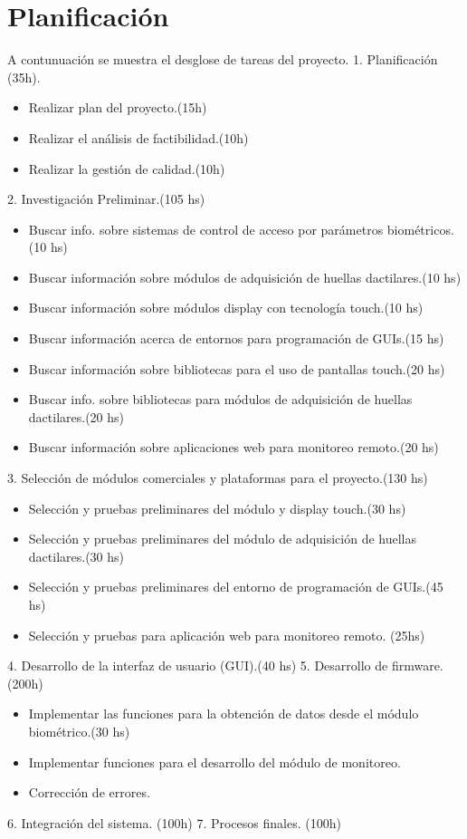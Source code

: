 \section{Planificación}
A contunuación se muestra el desglose de tareas del proyecto.
1. Planificación (35h).
\begin{itemize}
\item Realizar plan del proyecto.(15h)
\item Realizar el análisis de factibilidad.(10h)
\item Realizar la gestión de calidad.(10h)
\end{itemize} 
2. Investigación Preliminar.(105 hs)
\begin{itemize}
\item Buscar info. sobre sistemas de control de acceso por parámetros biométricos.(10 hs)
\item Buscar información sobre módulos de adquisición de huellas dactilares.(10 hs)
\item Buscar información sobre módulos display con tecnología touch.(10 hs)
\item Buscar información acerca de entornos para programación de GUIs.(15 hs)
\item Buscar información sobre bibliotecas para el uso de pantallas touch.(20 hs)
\item Buscar info. sobre bibliotecas para módulos de adquisición de huellas dactilares.(20 hs)
\item Buscar información sobre aplicaciones web para monitoreo remoto.(20 hs)
\end{itemize}

3. Selección de módulos comerciales y plataformas para el proyecto.(130 hs)
\begin{itemize}
\item Selección y pruebas preliminares del módulo y display touch.(30 hs)
\item Selección y pruebas preliminares del módulo de adquisición de huellas dactilares.(30 hs) 
\item Selección y pruebas preliminares del entorno de programación de GUIs.(45 hs)
\item Selección y pruebas para aplicación web para monitoreo remoto. (25hs)
\end{itemize}

4. Desarrollo de la interfaz de usuario (GUI).(40 hs)
5. Desarrollo de firmware.(200h)
\begin{itemize}
\item Implementar las funciones para la obtención de datos desde el módulo biométrico.(30 hs)
\item Implementar funciones para el desarrollo del módulo de monitoreo.
\item Corrección de errores.
\end{itemize}
6. Integración del sistema. (100h)
7. Procesos finales. (100h)

